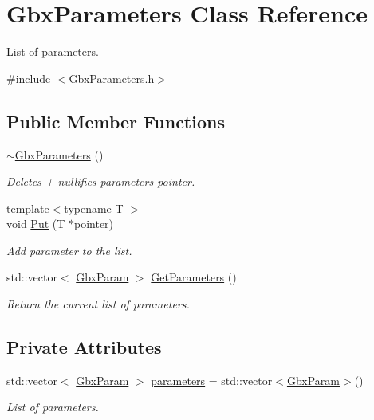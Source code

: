 \hypertarget{classGbxParameters}{\section{Gbx\-Parameters Class Reference}
\label{classGbxParameters}
}


List of parameters.  




{\ttfamily \#include $<$Gbx\-Parameters.\-h$>$}

\subsection*{Public Member Functions}
\begin{DoxyCompactItemize}
\item 
\hypertarget{classGbxParameters_afac5dd05e28a0e7014483317fc83fdf5}{\hyperlink{classGbxParameters_afac5dd05e28a0e7014483317fc83fdf5}{$\sim$\-Gbx\-Parameters} ()}\label{classGbxParameters_afac5dd05e28a0e7014483317fc83fdf5}

\begin{DoxyCompactList}\small\item\em Deletes + nullifies parameters pointer. \end{DoxyCompactList}\item 
{\footnotesize template$<$typename T $>$ }\\void \hyperlink{classGbxParameters_a2cf83794717cf9fdc13e5ff12e259f04}{Put} (T $\ast$pointer)
\begin{DoxyCompactList}\small\item\em Add parameter to the list. \end{DoxyCompactList}\item 
\hypertarget{classGbxParameters_a09302bc40359205cd294b8bcf2ab1c2e}{std\-::vector$<$ \hyperlink{structGbxParam}{Gbx\-Param} $>$ \hyperlink{classGbxParameters_a09302bc40359205cd294b8bcf2ab1c2e}{Get\-Parameters} ()}\label{classGbxParameters_a09302bc40359205cd294b8bcf2ab1c2e}

\begin{DoxyCompactList}\small\item\em Return the current list of parameters. \end{DoxyCompactList}\end{DoxyCompactItemize}
\subsection*{Private Attributes}
\begin{DoxyCompactItemize}
\item 
\hypertarget{classGbxParameters_aeabcb21396d3198d718c94de23595750}{std\-::vector$<$ \hyperlink{structGbxParam}{Gbx\-Param} $>$ \hyperlink{classGbxParameters_aeabcb21396d3198d718c94de23595750}{parameters} = std\-::vector$<$\hyperlink{structGbxParam}{Gbx\-Param}$>$()}\label{classGbxParameters_aeabcb21396d3198d718c94de23595750}

\begin{DoxyCompactList}\small\item\em List of parameters. \end{DoxyCompactList}\end{DoxyCompactItemize}


